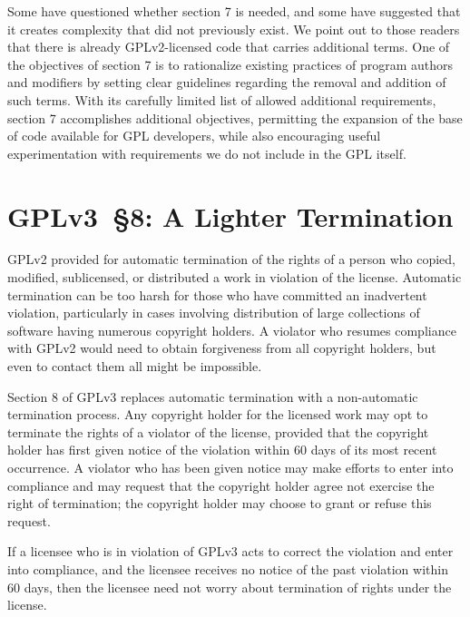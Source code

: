 
Some have questioned whether section 7 is needed, and some have suggested
that it creates complexity that did not previously exist.  We point out to
those readers that there is already GPLv2-licensed code that carries
additional terms.  One of the objectives of section 7 is to rationalize
existing practices of program authors and modifiers by setting clear
guidelines regarding the removal and addition of such terms.  With its
carefully limited list of allowed additional requirements, section 7
accomplishes additional objectives, permitting the expansion of the base of
code available for GPL developers, while also encouraging useful
experimentation with requirements we do not include in the GPL itself.

\section{GPLv3~\S8: A Lighter Termination}


GPLv2 provided for automatic termination of the rights of a person who
copied, modified, sublicensed, or distributed a work in violation of the
license.  Automatic termination can be too harsh for those who have committed
an inadvertent violation, particularly in cases involving distribution of
large collections of software having numerous copyright holders.  A violator
who resumes compliance with GPLv2 would need to obtain forgiveness from all
copyright holders, but even to contact them all might be impossible.


Section 8 of GPLv3 replaces automatic termination with a non-automatic
termination process.  Any copyright holder for the licensed work may opt to
terminate the rights of a violator of the license, provided that the
copyright holder has first given notice of the violation within 60 days of
its most recent occurrence. A violator who has been given notice may make
efforts to enter into compliance and may request that the copyright holder
agree not exercise the right of termination; the copyright holder may choose
to grant or refuse this request.


If a licensee who is in violation of GPLv3 acts to correct the violation and
enter into compliance, and the licensee receives no notice of the past
violation within 60 days, then the licensee need not worry about termination
of rights under the license.

